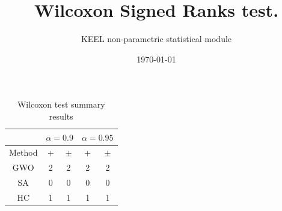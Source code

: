 \documentclass[a4paper,10pt]{article}
\title{Wilcoxon Signed Ranks test.}
\date{\today}
\author{KEEL non-parametric statistical module}
\begin{document}
\pagestyle{empty}
\maketitle
\thispagestyle{empty}


\begin{table}
\centering\scriptsize
{}
\caption{Ranks computed by the Wilcoxon test}

\end{table}

 \clearpage 


\begin{table}
\centering\scriptsize
{}
\caption{Summary of the Wilcoxon test. \textbullet = the method in the row improves the method of the column. \textopenbullet = the method in the column improves the method of the row. Upper diagonal of level significance $\alpha=0.9$,Lower diagonal level of significance $\alpha=0.95$}

\end{table}

 \clearpage 


\begin{table}[!htp]
\centering\scriptsize
\begin{tabular}{
|c|c|c|c|c|}
\hline
&\multicolumn{2}{c|}{$\alpha=0.9$} & \multicolumn{2}{c|}{$\alpha=0.95$}\\\hline
Method & + & $\pm$ & + & $\pm$ \\
\hline
GWO & 2 & 2 & 2 & 2\\
\hline
SA & 0 & 0 & 0 & 0\\
\hline
HC & 1 & 1 & 1 & 1\\
\hline

\end{tabular}
\caption{Wilcoxon test summary results}

\end{table}

 \clearpage 
\end{document}
